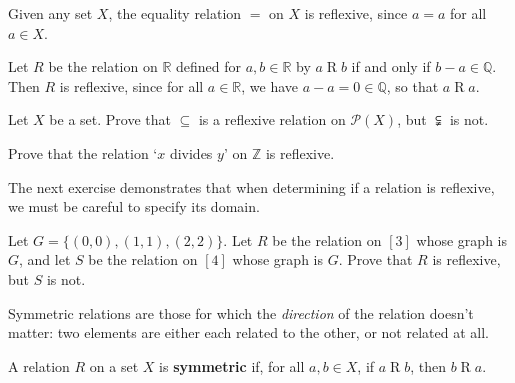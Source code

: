 \begin{center}
\end{center}

\begin{example}
\label{exEqualityIsReflexive}
Given any set $X$, the equality relation $=$ on $X$ is reflexive, since $a = a$ for all $a \in X$.
\end{example}

\begin{example}
\label{exDifferenceOfRealsInQIsReflexive}
Let $R$ be the relation on $\mathbb{R}$ defined for $a,b \in \mathbb{R}$ by $a \mathrel{R} b$ if and only if $b-a \in \mathbb{Q}$. Then $R$ is reflexive, since for all $a \in \mathbb{R}$, we have $a-a = 0 \in \mathbb{Q}$, so that $a \mathrel{R} a$.
\end{example}

\begin{exercise}
\label{exSubsetIsReflexive}
Let $X$ be a set. Prove that $\subseteq$ is a reflexive relation on $\mathcal{P}(X)$, but $\subsetneqq$ is not.
\end{exercise}

\begin{exercise}
\label{exDivisibilityIsReflexive}
Prove that the relation `$x$ divides $y$' on $\mathbb{Z}$ is reflexive.
\end{exercise}

The next exercise demonstrates that when determining if a relation is reflexive, we must be careful to specify its domain.

\begin{exercise}
\label{exReflexivitySensitiveToDomainOfRelation}
Let $G = \{ (0,0), (1,1), (2,2) \}$. Let $R$ be the relation on $[3]$ whose graph is $G$, and let $S$ be the relation on $[4]$ whose graph is $G$. Prove that $R$ is reflexive, but $S$ is not.
\end{exercise}

Symmetric relations are those for which the \textit{direction} of the relation doesn't matter: two elements are either each related to the other, or not related at all.

\begin{definition}
\label{defSymmetricRelation}
A relation $R$ on a set $X$ is \textbf{symmetric} if, for all $a,b \in X$, if $a \mathrel{R} b$, then $b \mathrel{R} a$.
\end{definition}

